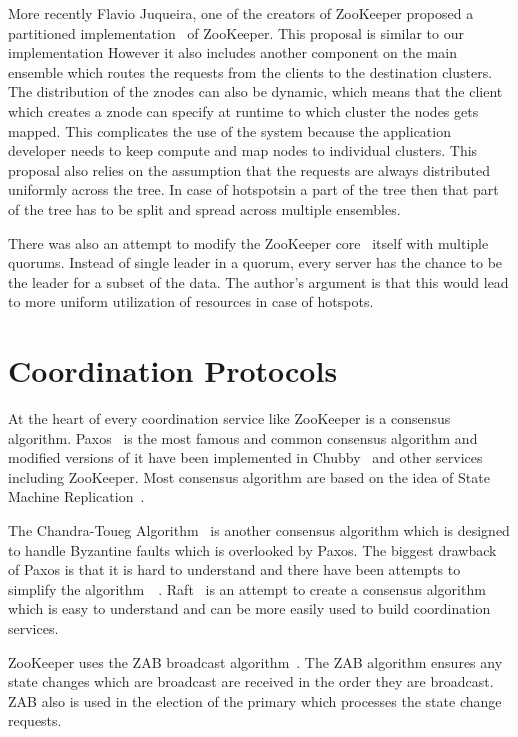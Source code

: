 More recently Flavio Juqueira, one of the creators of ZooKeeper proposed a partitioned implementation~\cite{junqueira2010partitioned} of ZooKeeper. This proposal is similar to our implementation However it also includes another component on the main ensemble which routes the requests from the clients to the destination clusters. The distribution of the znodes can also be dynamic, which means that the client which creates a znode can specify at runtime to which cluster the nodes gets mapped. This complicates the use of the system because the application developer needs to keep compute and map nodes to individual clusters. This proposal also relies on the assumption that the requests are always distributed uniformly across the tree. In case of hotspotsin a part of the tree then that part of the tree has to be split and spread across multiple ensembles.

There was also an attempt to modify the ZooKeeper core~\cite{biligiri2014multiquorum} itself with multiple quorums. Instead of single leader in a quorum, every server has the chance to be the leader for a subset of the data. The author's argument is that this would lead to more uniform utilization of resources in case of hotspots.

\section{Coordination Protocols}

At the heart of every coordination service like ZooKeeper is a consensus algorithm. Paxos~\cite{lamport2001paxos} is the most famous and common consensus algorithm and modified versions of it have been implemented in Chubby~\cite{burrows2006chubby} and other services including ZooKeeper. Most consensus algorithm are based on the idea of State Machine Replication~\cite{schneider1990implementing}. 

The Chandra-Toueg Algorithm~\cite{Chandra:1996:UFD:226643.226647} is another consensus algorithm which is designed to handle Byzantine faults which is overlooked by Paxos. The biggest drawback of Paxos is that it is hard to understand and there have been attempts to simplify the algorithm~\cite{chandra2007paxos}~\cite{lampson2001abcd}. Raft~\cite{ongaro2013search} is an attempt to create a consensus algorithm which is easy to understand and can be more easily used to build coordination services.

ZooKeeper uses the ZAB broadcast algorithm~\cite{junqueira2011zab}. The ZAB algorithm ensures any state changes which are broadcast are received in the order they are broadcast. ZAB also is used in the election of the primary which processes the state change requests.


